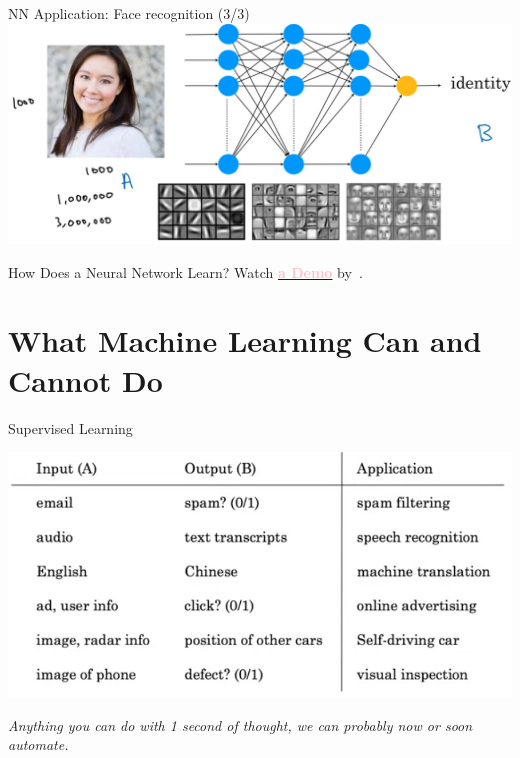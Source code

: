 \documentclass[pdf]{beamer}
\theoremstyle{mystyle}
\begin{document}
\begin{frame}{NN Application: Face recognition (3/3)}
		\centering
		\includegraphics[scale=.225]{face-recognition-intro-3}
\end{frame}

\begin{frame}{How Does a Neural Network Learn?}
	Watch \href{https://phiresky.github.io/neural-network-demo/}{\textcolor{pink}{\textbf{a Demo}}} by~\citet{phiresky2017neuralnetwork}.
\end{frame}


\section{What Machine Learning Can and Cannot Do}
\begin{frame}{Supervised Learning}
	\begin{center}
		\includegraphics[scale=.3]{what-ML-can-do}
	\end{center}
	\begin{center}
		\pause \textit{Anything you can do with 1 second of thought, we can probably now or soon automate.}
	\end{center}
\end{frame}
\end{document}
